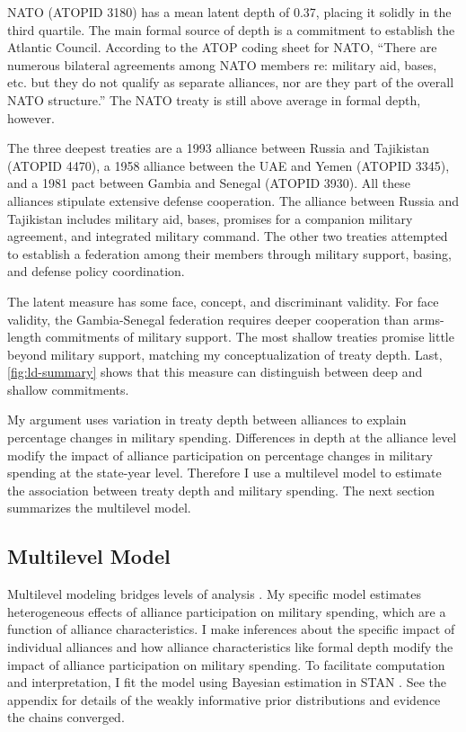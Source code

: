\documentclass[12pt]{article}
\begin{document}
NATO (ATOPID 3180) has a mean latent depth of 0.37, placing it solidly in the third quartile. 
The main formal source of depth is a commitment to establish the Atlantic Council. 
According to the ATOP coding sheet for NATO, ``There are numerous bilateral agreements among NATO members re: military aid, bases, etc. but they do not qualify as separate alliances, nor are they part of the overall NATO structure.''
The NATO treaty is still above average in formal depth, however. 


The three deepest treaties are a 1993 alliance between Russia and Tajikistan (ATOPID 4470), a 1958 alliance between the UAE and Yemen (ATOPID 3345), and a 1981 pact between Gambia and Senegal (ATOPID 3930). 
All these alliances stipulate extensive defense cooperation. 
The alliance between Russia and Tajikistan includes military aid, bases, promises for a companion military agreement, and integrated military command. 
The other two treaties attempted to establish a federation among their members through military support, basing, and defense policy coordination. 


The latent measure has some face, concept, and discriminant validity. 
For face validity, the Gambia-Senegal federation requires deeper cooperation than arms-length commitments of military support. 
The most shallow treaties promise little beyond military support, matching my conceptualization of treaty depth. 
Last, \autoref{fig:ld-summary} shows that this measure can distinguish between deep and shallow commitments. 


My argument uses variation in treaty depth between alliances to explain percentage changes in military spending.
Differences in depth at the alliance level modify the impact of alliance participation on percentage changes in military spending at the state-year level. 
Therefore I use a multilevel model to estimate the association between treaty depth and military spending.  
The next section summarizes the multilevel model. 


\subsection{Multilevel Model} 


Multilevel modeling bridges levels of analysis \citep{SteenbergenJones2002, GelmanHill2007}. 
My specific model estimates heterogeneous effects of alliance participation on military spending, which are a function of alliance characteristics. 
I make inferences about the specific impact of individual alliances and how alliance characteristics like formal depth modify the impact of alliance participation on military spending. 
To facilitate computation and interpretation, I fit the model using Bayesian estimation in STAN \citep{Carpenteretal2016}. 
See the appendix for details of the weakly informative prior distributions and evidence the chains converged.
\end{document}

